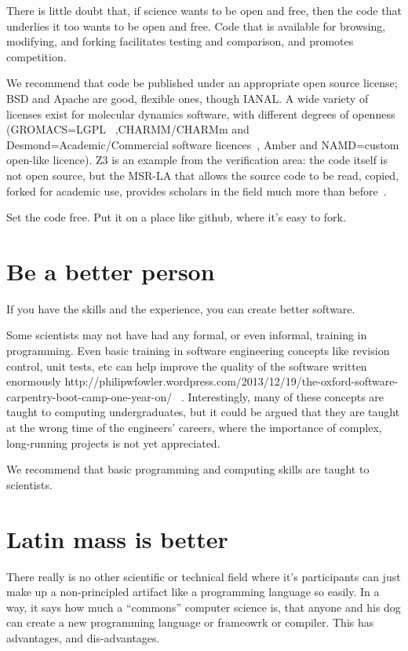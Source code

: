 \documentclass[conference]{IEEEtran}
\begin{document}
There is little doubt that, if science wants to be open and free,
then the code that underlies it too wants to be open and free. Code
that is available for browsing, modifying, and forking facilitates
testing and comparison, and promotes competition.

We recommend that code be published under an appropriate open source
license; BSD and Apache are good, flexible ones, though IANAL.  A wide
variety of licenses exist for molecular dynamics software, with
different degrees of openness (GROMACS=LGPL~\cite{Hess2008}
,CHARMM/CHARMm and Desmond=Academic/Commercial software
licences~\cite{Brooks2009,Bowers2006}, Amber and NAMD=custom open-like
licence). Z3 is an example from the verification area: the code itself
is not open source, but the MSR-LA that allows the source code to be
read, copied, forked for academic use, provides scholars in the field
much more than before~\cite{deMoura2012Z3open}.

Set the code free. Put it on a place like github, where it's easy to fork. 


\section{Be a better person}

If you have the skills and the experience, you can create better software. 

Some scientists may not have had any formal, or even informal,
training in programming. Even basic training in software engineering
concepts like revision control, unit tests, etc can help improve the
quality of the software written enormously
http://philipwfowler.wordpress.com/2013/12/19/the-oxford-software-carpentry-boot-camp-one-year-on/
~\cite{Wilson2014}.  
Interestingly, many of these concepts are taught
to computing undergraduates, but it could be argued that they are
taught at the wrong time of the engineers' careers, where the
importance of complex, long-running projects is not yet appreciated.

We recommend that basic programming and computing skills are taught to
scientists.


\section{Latin mass is better}

There really is no other scientific or technical field where it's
participants can just make up a non-principled artifact like a
programming language so easily. In a way, it says how much a
``commons'' computer science is, that anyone and his dog can create a
new programming language or frameowrk or compiler. This has
advantages, and dis-advantages.
\end{document}
